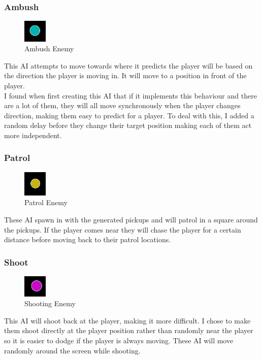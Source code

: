 \documentclass{article}
\newcommand{\n}[0]{\\[\baselineskip]}
\begin{document}
\subsubsection{Ambush}
\begin{figure}[H]
\centering
\includegraphics[width=0.1\textwidth, keepaspectratio]{imgs/AmbushEnemy.png}
\caption{Ambush Enemy}
\end{figure}
\noindent
This AI attempts to move towards where it predicts the player will be based on the direction the player is moving in. It will move to a position in front of the player. 
\n
I found when first creating this AI that if it implements this behaviour and there are a lot of them, they will all move synchronously when the player changes direction, making them easy to predict for a player. To deal with this, I added a random delay before they change their target position making each of them act more independent.

\subsubsection{Patrol}
\begin{figure}[H]
\centering
\includegraphics[width=0.1\textwidth, keepaspectratio]{imgs/PatrolEnemy.png}
\caption{Patrol Enemy}
\end{figure}
\noindent
These AI spawn in with the generated pickups and will patrol in a square around the pickups. If the player comes near they will chase the player for a certain distance before moving back to their patrol locations. 

\subsubsection{Shoot}
\begin{figure}[H]
\centering
\includegraphics[width=0.1\textwidth, keepaspectratio]{imgs/ShootEnemy.png}
\caption{Shooting Enemy}
\end{figure}
\noindent
This AI will shoot back at the player, making it more difficult. I chose to make them shoot directly at the player position rather than randomly near the player so it is easier to dodge if the player is always moving. These AI will move randomly around the screen while shooting.
\end{document}
